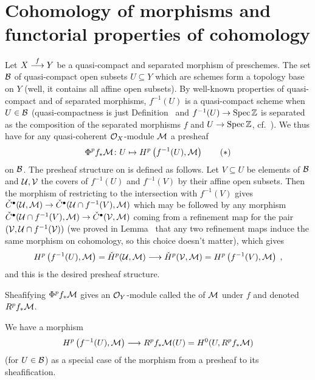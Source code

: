 \documentclass[a4paper,parskip=half,numbers=enddot, DIV=12]{scrreprt}
\begin{document}
\section{Cohomology of morphisms and functorial properties of cohomology}
Let $X\morphism[f]Y$ be a quasi-compact and separated morphism of preschemes. The set $\mathcal{B}$ of quasi-compact open subsets $U\subseteq Y$ which are schemes form a topology base on $Y$ (well, it contains all affine open subsets). By well-known properties of quasi-compact and of separated morphisms, $f^{-1}(U)$ is a quasi-compact scheme when $U\in \mathcal{B}$ (quasi-compactness is just Definition~ and $f^{-1}(U)\morphism\Spec\IZ$ is separated as the composition of the separated morphisms $f$ and $U\morphism\Spec \IZ$, cf.\ \cite[Fact~1.5.7]{alggeo1}). We thus have for any quasi-coherent $\mathcal{O}_X$-module $\mathcal{M}$ a presheaf
\begin{align}\lbl{eq:cohoPresheaf}
	\Phi^pf_*\Mm\colon U\mapsto H^p\left(f^{-1}(U),\Mm\right)\tag{$*$}
\end{align}
on $\mathcal{B}$. The presheaf structure on  is defined as follows. Let $V\subseteq U$ be elements of $\mathcal{B}$ and $\mathcal{U},\mathcal{V}$ the covers of $f^{-1}(U)$ and $f^{-1}(V)$ by their affine open subsets. Then the morphism of restricting to the intersection with $f^{-1}(V)$ gives $\check{C}^\bullet (\Uu,\Mm)\morphism\check{C}^\bullet (\Uu\cap f^{-1}(V),\Mm)$ which may be followed by any morphism $\check{C}^\bullet (\Uu\cap f^{-1}(V),\Mm)\morphism\check{C}^\bullet (\Vv,\Mm)$ coming from a refinement map for the pair $(\mathcal{V},\mathcal{U}\cap f^{-1}(\mathcal{V}))$ 
(we proved in Lemma~ that any two refinement maps induce the same morphism on cohomology, so this choice doesn't matter), which gives
\begin{align*}
	H^p\left(f^{-1}(U),\Mm\right)=\check{H}^p(\Uu,\Mm)\morphism\check{H}^p(\Vv,\Mm)=H^p\left(f^{-1}(V),\Mm\right)\;,
\end{align*}
and this is the desired presheaf structure.

\begin{defi}
	Sheafifying $\Phi^pf_*\mathcal{M}$ gives an $\mathcal{O}_Y$-module called the  of $\mathcal{M}$ under $f$ and denoted $R^pf_*\mathcal{M}$.
\end{defi}
 We have a morphism
 \begin{align}\lbl{eq:HpToRp}
 	H^p\left(f^{-1}(U),\Mm\right)\morphism R^pf_*\Mm(U)=H^0(U,R^pf_*\Mm)
 \end{align}
 (for $U\in\mathcal{B}$) as a special case of the morphism from a presheaf to its sheafification.
 
\end{document}
